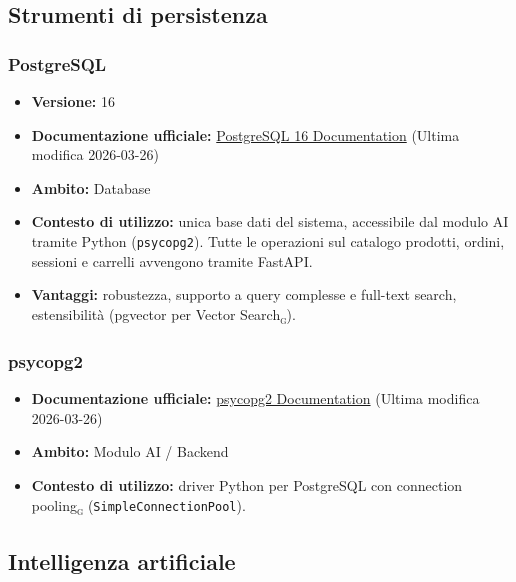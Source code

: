 \documentclass[a4paper, 11pt, oneside]{scrartcl}
\begin{document}
\subsection{Strumenti di persistenza}

\subsubsection{PostgreSQL}
\begin{itemize}[noitemsep]
\item \textbf{Versione:} 16
\item \textbf{Documentazione ufficiale:} \href{https://www.postgresql.org/docs/16/}{PostgreSQL 16 Documentation} (Ultima modifica 2026-03-26)
\item \textbf{Ambito:} Database
\item \textbf{Contesto di utilizzo:} unica base dati del sistema, accessibile dal modulo AI tramite Python (\texttt{psycopg2}). Tutte le operazioni sul catalogo prodotti, ordini, sessioni e carrelli avvengono tramite FastAPI.
\item \textbf{Vantaggi:} robustezza, supporto a query complesse e full-text search, estensibilit\`a (pgvector per Vector Search\textsubscript{\textsc{g}}).
\end{itemize}

\subsubsection{psycopg2}
\begin{itemize}[noitemsep]
\item \textbf{Documentazione ufficiale:} \href{https://www.psycopg.org/docs/}{psycopg2 Documentation} (Ultima modifica 2026-03-26)
\item \textbf{Ambito:} Modulo AI / Backend
\item \textbf{Contesto di utilizzo:} driver Python per PostgreSQL con connection pooling\textsubscript{\textsc{g}} (\texttt{SimpleConnectionPool}).
\end{itemize}

\subsection{Intelligenza artificiale}
\end{document}
